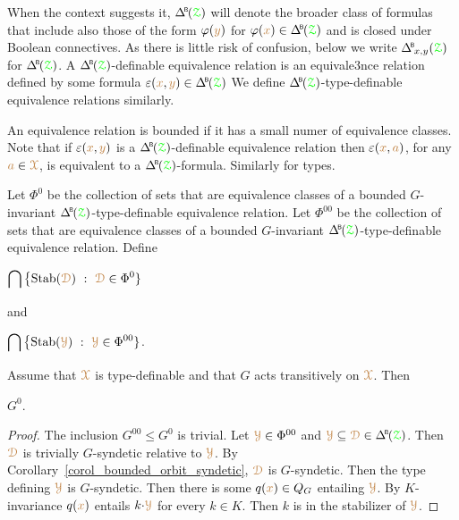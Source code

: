 When the context suggests it, $\BDelta(\grZ)$ will denote the broader class of formulas that include also those of the form  $\varphi({\color{brown} y})$ for $\phi({\mr x})\in\BDelta(\grZ)$ and is closed under Boolean connectives.
As there is little risk of confusion, below we write $\BDelta_{x,y}(\grZ)$ for $\BDelta(\grZ)$.
A $\BDelta(\grZ)$-definable equivalence relation is an equivale3nce relation defined by some formula $\epsilon({\mr x},{\mr y})\in\BDelta(\grZ)$
We define $\BDelta(\grZ)$-type-definable equivalence relations similarly.

An equivalence relation is bounded if it has a small numer of equivalence classes.
Note that if $\varepsilon({\color{brown} x},{\color{brown} y})$ is a $\BDelta(\grZ)$-definable equivalence relation then $\varepsilon({\color{brown} x},{\color{brown} a})$, for any ${\color{brown} a}\in{\color{brown}\EuScript X}$, is equivalent to a $\BDelta(\grZ)$-formula.
Similarly for types.

\begin{definition}\label{def_G00}
  Let $\Phi^0$ be the collection of sets that are equivalence classes of a bounded $G$-invariant $\BDelta(\grZ)$-type-definable equivalence relation.
  Let $\Phi^{00}$ be the collection of sets that are equivalence classes of a bounded $G$-invariant $\BDelta(\grZ)$-type-definable equivalence relation.
  Define\medskip

  \medrel{=}$\displaystyle\bigcap\big\{\Stab(\mrD)\ :\  \mrD\in\Phi^0\}$

  and

  \medrel{=}$\displaystyle\bigcap\big\{\Stab(\mrY)\ :\  \mrY\in\Phi^{00}\}$.

\end{definition}

\begin{proposition}
  Assume that ${\color{brown}\EuScript X}$ is type-definable and that $G$ acts transitively on ${\color{brown}\EuScript X}$.
  Then 
  
  \medrel{\leq}$G^0$.
\end{proposition}

\begin{proof}
  The inclusion $G^{00}\leq G^0$ is trivial.
  Let ${\color{brown}\EuScript Y}\in\Phi^{00}$ and $\mrY\subseteq\mrD\in\BDelta(\grZ)$.
  Then ${\color{brown}\EuScript D}$ is trivially $G$-syndetic relative to ${\color{brown}\EuScript Y}$.
  By Corollary~\ref{corol_bounded_orbit_syndetic}, ${\color{brown}\EuScript D}$ is $G$-syndetic.
  Then the type defining ${\color{brown}\EuScript Y}$ is $G$-syndetic.
  Then there is some $q({\color{brown} x})\in Q_G$ entailing ${\color{brown}\EuScript Y}$.
  By $K$-invariance $q({\color{brown} x})$ entails $k{\cdot}{\color{brown}\EuScript Y}$ for every $k\in K$.
  Then $k$ is in the stabilizer of ${\color{brown}\EuScript Y}$.
\end{proof}

